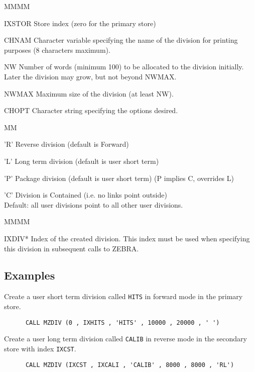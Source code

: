 \begin{DL}{MMMM}
\item[IXSTOR]Store index (zero for the primary store)
\item[CHNAM]Character variable specifying the
name of the division for printing purposes
(8 characters maximum).
\item[NW]Number of words (minimum 100) to be allocated to the division
initially. Later the division
may grow, but not beyond NWMAX.
\item[NWMAX]Maximum size of the division (at least NW).
\item[CHOPT]Character string specifying the options desired.
\begin{DL}{MM}
\item['R']Reverse division (default is Forward)
\item['L']Long term division (default is user short term)
\item['P']Package division (default is user short term)
(P implies C, overrides L)
\item['C']Division is Contained (i.e. no links point outside)\\
Default: all user divisions point to all other user divisions.
\end{DL}
\end{DL}
\Odesc
\begin{DL}{MMMM}
\item[IXDIV*]Index of the created division. This index
must be used when specifying this division in subsequent calls
to ZEBRA.
\end{DL}
\subsection{Examples}
\par Create a user short term division called {\tt HITS} in
forward mode in the primary store.
\begin{verbatim}
      CALL MZDIV (0 , IXHITS , 'HITS' , 10000 , 20000 , ' ')
\end{verbatim}
\par Create a user long term division called {\tt CALIB} in
reverse mode in the secondary store with index {\tt IXCST}.
\begin{verbatim}
      CALL MZDIV (IXCST , IXCALI , 'CALIB' , 8000 , 8000 , 'RL')
\end{verbatim}
